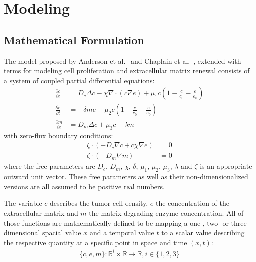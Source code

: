\section{Modeling}

\subsection{Mathematical Formulation}

The model proposed by Anderson et al.~\cite{anderson_continuous_1998,anderson_mathematical_2000} and Chaplain et al.~\cite{anderson_continuous_1998,chaplain_mathematical_2006-1,franssen_mathematical_2019}, extended with terms for modeling cell proliferation and extracellular matrix renewal consists of a system of coupled partial differential equations: 
\begin{align}
	\frac{\partial c}{\partial t} &= D_c \Delta c - \chi \nabla \cdot (c\nabla e)  + \mu_1 c\left(1-\frac{c}{c_0}-\frac{e}{e_0}\right)\label{eq1}\\
	\frac{\partial e}{\partial t} &= -\delta m e  + \mu_2 c\left(1-\frac{c}{c_0}-\frac{e}{e_0}\right)\label{eq2}\\
	\frac{\partial m}{\partial t} &= D_m \Delta c + \mu_3 c - \lambda m\label{eq3}
\end{align}
with zero-flux boundary conditions:
\begin{align}
	\zeta \cdot  (-D_c \nabla c + c \chi\nabla e) &= 0 \label{eq4}\\
	\zeta \cdot (-D_m\nabla m ) &= 0\label{eq5}
\end{align}
where the free parameters are $D_c$, $D_m$, $\chi$, $\delta$, $\mu_1$, $\mu_2$, $\mu_3$, $\lambda$ and $\zeta$ is an appropriate outward unit vector. These free parameters as well as their non-dimensionalized versions are all assumed to be positive real numbers.

The variable $c$ describes the tumor cell density, $e$ the concentration of the extracellular matrix and $m$ the matrix-degrading enzyme concentration. All of those functions are mathematically defined to be mapping a one-, two- or three-dimensional spacial value $x$ and a temporal value $t$ to a scalar value describing the respective quantity at a specific point in space and time $(x,t)$:
\begin{align*}
     \{c,e,m\}: \mathbb{R}^{i} \times \mathbb{R} \rightarrow \mathbb{R}, i \in \{1,2,3\}
\end{align*}

